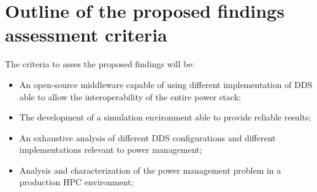 \section{Outline of the proposed findings assessment criteria}
The criteria to asses the proposed findings will be:
\begin{itemize}
    \item An open-source middleware capable of using different implementation of DDS able to allow the interoperability of the entire power stack;    
    \item The development of a simulation environment able to provide reliable results;
    \item An exhaustive analysis of different DDS configurations and different implementations relevant to power management;
    \item Analysis and characterization of the power management problem in a production HPC environment;
\end{itemize}
